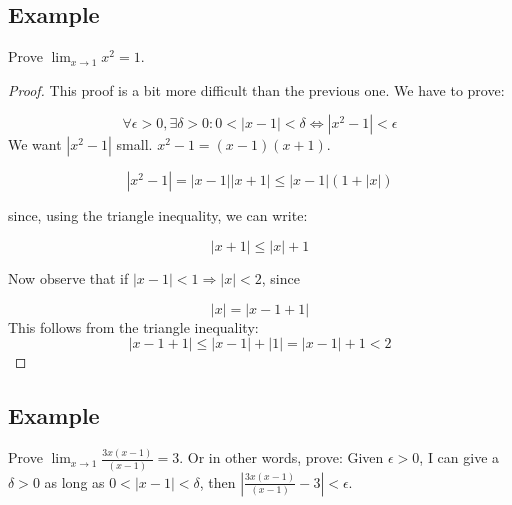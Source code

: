 \documentclass[12pt]{scrbook}
\begin{document}
\clearpage
\subsection{Example}

Prove $\lim_{x \to 1} x^2 = 1$.

\hspace{5cm}


\begin{proof}
This proof is a bit more difficult than the previous one.  We have to prove:

\[ \forall \epsilon > 0,  \exists \delta > 0: 0 < | x - 1 | < \delta \Leftrightarrow | x^2 - 1 | < \epsilon \]
We want $ | x^2 - 1| $ small.  $x^2 - 1 = (x-1)(x+1)$.

\[ | x^2 - 1 | = | x - 1 | | x + 1 | \leq | x - 1 | ( 1 + |x| ) \]

since, using the triangle inequality, we can write:

\[ | x + 1 | \leq | x | + 1 \]

Now observe that if $ | x - 1 |  < 1 \Rightarrow | x | < 2$, since 

\[ | x | = | x - 1 + 1 | \]
This follows from the triangle inequality:
\[ | x - 1 + 1 |  \leq | x - 1 | + |1| = |x - 1| + 1 < 2 \]




\end{proof}

\clearpage
\subsection{Example}

Prove $\lim_{x \to 1} \frac{3x(x-1)}{(x-1)} = 3$.
Or in other words, 
prove: Given $\epsilon > 0$, I can give a $\delta > 0$ as long as $ 0 < | x - 1 | < \delta $, then 
$ \left | \frac{3x(x-1)}{(x-1)} - 3 \right | < \epsilon $.
\end{document}
